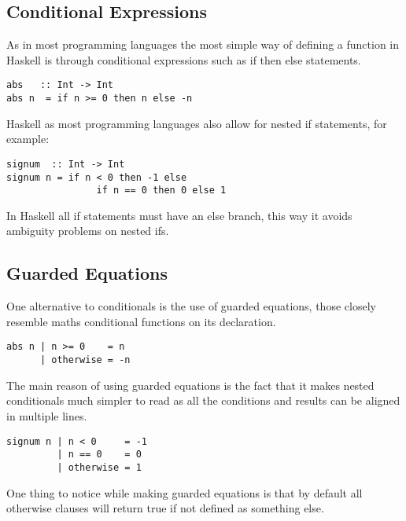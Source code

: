 \documentclass[12pt, oneside]{article}
\begin{document}
\subsection{Conditional Expressions}
As in most programming languages the most simple way of defining a function in Haskell is through conditional expressions such as if then else statements.
\begin{lstlisting}
abs   :: Int -> Int
abs n  = if n >= 0 then n else -n
\end{lstlisting}
Haskell as most programming languages also allow for nested if statements, for example:
\begin{lstlisting}
signum  :: Int -> Int
signum n = if n < 0 then -1 else
                if n == 0 then 0 else 1
\end{lstlisting}
In Haskell all if statements must have an else branch, this way it avoids ambiguity problems on nested ifs.
\subsection{Guarded Equations}
One alternative to conditionals is the use of guarded equations, those closely resemble maths conditional functions on its declaration.
\begin{lstlisting}
abs n | n >= 0    = n
      | otherwise = -n
\end{lstlisting}
The main reason of using guarded equations is the fact that it makes nested conditionals much simpler to read as all the conditions and results can be aligned in multiple lines.
\begin{lstlisting}
signum n | n < 0     = -1
         | n == 0    = 0
         | otherwise = 1
\end{lstlisting}
One thing to notice while making guarded equations is that by default all otherwise clauses will return true if not defined as something else.
\end{document}
